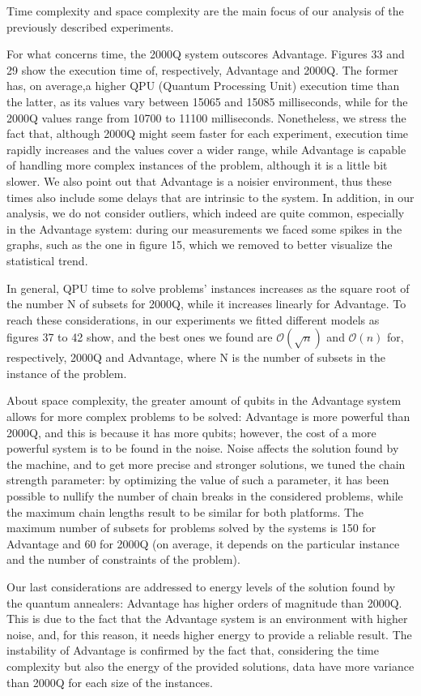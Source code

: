 \documentclass[oneside,a4paper]{article}
\begin{document}
Time complexity and space complexity are the main focus of our analysis of the previously described experiments. 


For what concerns time, the 2000Q system outscores Advantage. Figures 33 and 29 show the execution time of, respectively, Advantage and 2000Q. The former has, on average,a higher QPU (Quantum Processing Unit) execution time than the latter, as its values vary between 15065 and 15085 milliseconds, while for the 2000Q values range from 10700 to 11100 milliseconds. Nonetheless, we stress the fact that, although 2000Q might seem faster for each experiment, execution time rapidly increases and the values cover a wider range, while Advantage is capable of handling more complex instances of the problem, although it is a little bit slower. We also point out that Advantage is a noisier environment, thus these times also include some delays that are intrinsic to the system. In addition, in our analysis, we do not consider outliers, which indeed are quite common, especially in the Advantage system: during our measurements we faced some spikes in the graphs, such as the one in figure 15, which we removed to better visualize the statistical trend.

In general, QPU time to solve problems’ instances increases as the square root of the number N of subsets for 2000Q, while it increases linearly for Advantage. To reach these considerations, in our experiments we fitted different models as figures 37 to 42 show, and the best ones we found are
$\mathcal{O}(\sqrt{n})$ and $\mathcal{O}(n)$ for, respectively, 2000Q and Advantage, where N is the number of subsets in the instance of the problem.

About space complexity, the greater amount of qubits in the Advantage system allows for more complex problems to be solved: Advantage is more powerful than 2000Q, and this is because it has more qubits; however, the cost of a more powerful system is to be found in the noise. Noise affects the solution found by the machine, and to get more precise and stronger solutions, we tuned the chain strength parameter: by optimizing the value of such a parameter, it has been possible to nullify the number of chain breaks in the considered problems, while the maximum chain lengths result to be similar for both platforms. The maximum number of subsets for problems solved by the systems is 150 for Advantage and 60 for 2000Q (on average, it depends on the particular instance and the number of constraints of the problem).

Our last considerations are addressed to energy levels of the solution found by the quantum annealers: Advantage has higher orders of magnitude than 2000Q. This is due to the fact that the Advantage system is an environment with higher noise, and, for this reason, it needs higher energy to provide a reliable result. The instability of Advantage is confirmed by the fact that, considering the time complexity but also the energy of the provided solutions, data have more variance than 2000Q for each size of the instances.
\\
\end{document}
